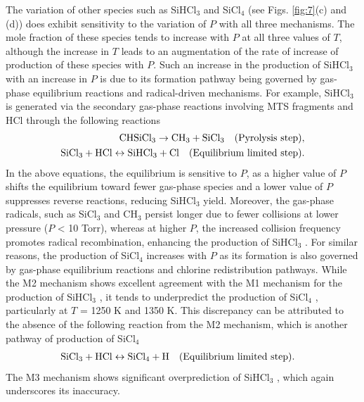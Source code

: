 \documentclass[final, letterpaper, square, comma, numbers, sort&compress]{elsarticle}
\begin{document}
The variation of other species such as SiHCl$_3$ and SiCl$_4$ (see Figs. \ref{fig:7}(c) and (d)) does exhibit sensitivity to the variation of $P$ with all three mechanisms. The mole fraction of these species tends to increase with $P$ at all three values of $T$, although the increase in $T$ leads to an augmentation of the rate of increase of production of these species with $P$. Such an increase in the production of SiHCl$_3$ with an increase in $P$ is due to its formation pathway being governed by gas-phase equilibrium reactions and radical-driven mechanisms. For example, SiHCl$_3$ is generated via the secondary gas-phase reactions involving MTS fragments and HCl through the following reactions
\begin{align*}
    \rm CHSiCl_3 \rightarrow CH_3 + SiCl_3 \quad (\textrm{Pyrolysis step}), & \\
    \rm SiCl_3 + HCl \leftrightarrow SiHCl_3 + Cl \quad (\textrm{Equilibrium limited step}). &
\end{align*}
In the above equations, the equilibrium is sensitive to $P$, as a higher value of $P$ shifts the equilibrium toward fewer gas-phase species and a lower value of $P$ suppresses reverse reactions, reducing SiHCl$_3$ yield. Moreover, the gas-phase radicals, such as SiCl$_3$ and CH$_3$ persist longer due to fewer collisions at lower pressure ($P$ < 10 Torr), whereas at higher $P$, the increased collision frequency promotes radical recombination, enhancing the production of SiHCl$_3$ . For similar reasons, the production of SiCl$_4$ increases with $P$ as its formation is also governed by gas-phase equilibrium reactions and chlorine redistribution pathways. While the M2 mechanism shows excellent agreement with the M1 mechanism for the production of SiHCl$_3$ , it tends to underpredict the production of SiCl$_4$ , particularly at $T$ = 1250 K and 1350 K. This discrepancy can be attributed to the absence of the following reaction from the M2 mechanism, which is another pathway of production of SiCl$_4$
\begin{align*}
    \rm SiCl_3 + HCl \leftrightarrow SiCl_4 + H \quad (\textrm{Equilibrium limited step}). &
\end{align*}
The M3 mechanism shows significant overprediction of SiHCl$_3$ , which again underscores its inaccuracy.
\end{document}
